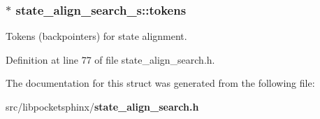 \subsubsection[{tokens}]{$\ast$ state\+\_\+align\+\_\+search\+\_\+s\+::tokens}\label{structstate__align__search__s_a2fae207533462fe6efe19c8a2a3a64e0}


Tokens (backpointers) for state alignment. 



Definition at line 77 of file state\+\_\+align\+\_\+search.\+h.



The documentation for this struct was generated from the following file\+:\begin{DoxyCompactItemize}
\item 
src/libpocketsphinx/{\bf state\+\_\+align\+\_\+search.\+h}\end{DoxyCompactItemize}
